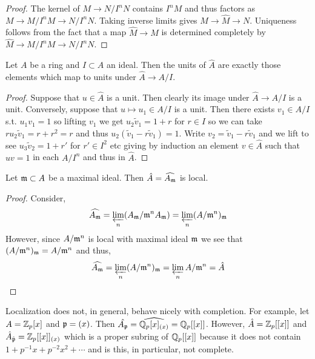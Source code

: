 \documentclass[12pt]{article}
\begin{document}
\begin{proof}
The kernel of $M \to N/I^n N$ contains $I^n M$ and thus factors as $M \to M / I^n M \to N / I^n N$. Taking inverse limits gives $M \to \hat{M} \to N$. Uniqueness follows from the fact that a map $\hat{M} \to M$ is determined completely by $\hat{M} \to M / I^n M \to N / I^n N$. 
\end{proof}

\begin{lemma}
Let $A$ be a ring and $I \subset A$ an ideal. Then the units of $\hat{A}$ are exactly those elements which map to units under $\hat{A} \to A / I$.
\end{lemma}

\begin{proof}
Suppose that $u \in \hat{A}$ is a unit. Then clearly its image under $\hat{A} \to A / I$ is a unit. Conversely, suppose that $u \mapsto u_1 \in A / I$ is a unit. Then there exists $v_1 \in A/I$ s.t. $u_1 v_1 = 1$ so lifting $v_1$ we get $u_2 \tilde{v}_1 = 1 + r$ for $r \in I$ so we can take $r u_2 \tilde{v}_1 = r + r^2 = r$ and thus $u_2 (\tilde{v}_1 - r \tilde{v}_1) = 1$. Write $v_2 = \tilde{v}_1 - r \tilde{v}_1$ and we lift to see $u_3 \tilde{v}_2 = 1 + r'$ for $r' \in I^2$ etc giving by induction an element $v \in \hat{A}$ such that $u v = 1$ in each $A / I^n$ and thus in $\hat{A}$.
\end{proof}

\begin{lemma}
Let $\mathfrak{m} \subset A$ be a maximal ideal. Then $\hat{A} = \widehat{A_{\mathfrak{m}}}$ is local.
\end{lemma}

\begin{proof}
Consider,
\[ \widehat{A_{\mathfrak{m}}} = \varprojlim_{n} (A_{\mathfrak{m}} / \mathfrak{m}^n A_{\mathfrak{m}}) = \varprojlim_{n} (A / \mathfrak{m}^n)_{\mathfrak{m}} \]
However, since $A / \mathfrak{m}^n$ is local with maximal ideal $\mathfrak{m}$ we see that $(A / \mathfrak{m}^n)_{\mathfrak{m}} = A / \mathfrak{m}^n$ and thus,
\[ \widehat{A_{\mathfrak{m}}} = \varprojlim_{n} (A / \mathfrak{m}^n)_{\mathfrak{m}} = \varprojlim_{n} A / \mathfrak{m}^n = \hat{A} \]
\end{proof}

\begin{rmk}
Localization does not, in general, behave nicely with completion. For example, let $A = \mathbb{Z}_p[x]$ and $\mathfrak{p} = (x)$. Then $\hat{A_{\mathfrak{p}}} = \widehat{\mathbb{Q}_p[x]_{(x)}} = \mathbb{Q}_p[[x]]$. However, $\hat{A} = \mathbb{Z}_p[[x]]$ and $\hat{A}_{\hat{\mathfrak{p}}} = \mathbb{Z}_p[[x]]_{(x)}$ which is a proper subring of $\mathbb{Q}_p[[x]]$ because it does not contain $1 + p^{-1} x + p^{-2} x^2 + \cdots$ and is this, in particular, not complete.
\end{rmk}
\end{document}
